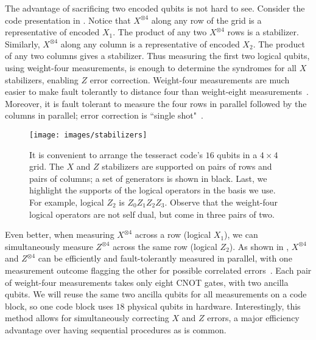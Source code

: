 \documentclass[10pt, twocolumn, aps, nofootinbib, longbibliography, nobibnotes, superscriptaddress]{revtex4-1} %
\begin{document}
The advantage of sacrificing two encoded qubits is not hard to see.  Consider the code presentation in .  Notice that $X^{\otimes 4}$ along any row of the grid is a representative of encoded $X_1$.  The product of any two $X^{\otimes 4}$ rows is a stabilizer.  Similarly, $X^{\otimes 4}$ along any column is a representative of encoded $X_2$.  The product of any two columns gives a stabilizer.  Thus measuring the first two logical qubits, using weight-four measurements, is enough to determine the syndromes for all $X$ stabilizers, enabling $Z$ error correction.  Weight-four measurements are much easier to make fault tolerantly to distance four than weight-eight measurements~\cite{prabhu21, PrabhuReichardt24code16}.  
Moreover, it is fault tolerant to measure the four rows in parallel followed by the columns in parallel; error correction is ``single shot"~\cite{delfosse2020short}.  

\begin{figure}
{\texttt{[image: images/stabilizers]}}
\caption{
It is convenient to arrange the tesseract code's $16$ qubits in a $4 \times 4$ grid.  The $X$ and $Z$ stabilizers are supported on pairs of rows and pairs of columns; a set of generators is shown in black.  Last, we highlight the supports of the logical operators in the basis we use.  For example, logical $Z_2$ is $Z_0 Z_1 Z_2 Z_3$.  Observe that the weight-four logical operators are not self dual, but come in three pairs of two.  
}
\label{f:stabilizers}
\end{figure}

Even better, when measuring $X^{\otimes 4}$ across a row (logical $X_1$), we can simultaneously measure $Z^{\otimes 4}$ across the same row (logical $Z_2$).  As shown in , $X^{\otimes 4}$ and $Z^{\otimes 4}$ can be efficiently and fault-tolerantly measured in parallel, with one measurement outcome flagging the other for possible correlated errors~\cite{Reichardt18steane}.  Each pair of weight-four measurements takes only eight CNOT gates, with two ancilla qubits.  We will reuse the same two ancilla qubits for all measurements on a code block, so one code block uses $18$ physical qubits in hardware.  Interestingly, this method allows for simultaneously correcting $X$ and $Z$ errors, a major efficiency advantage over having sequential procedures as is common.  
\end{document}

